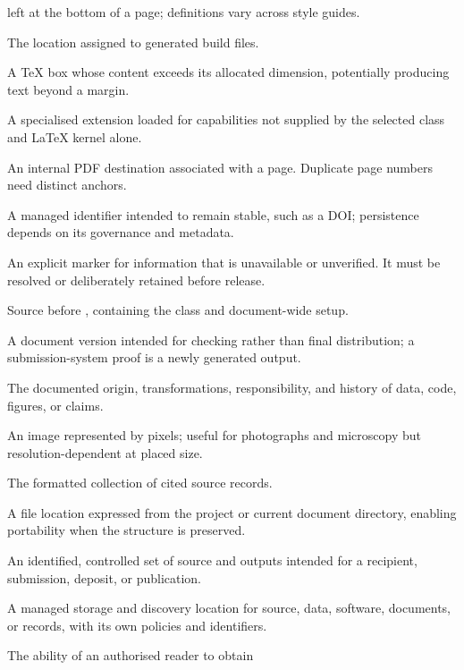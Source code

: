 \begin{description}[style=nextline,leftmargin=1.6em,itemsep=0.75em]
        left at the bottom of a page; definitions vary across style guides.
  \item[Output directory] The location assigned to generated build files.
  \item[Overfull box] A TeX box whose content exceeds its allocated dimension,
        potentially producing text beyond a margin.
  \item[Package] A specialised extension loaded for capabilities not supplied by
        the selected class and \LaTeX{} kernel alone.
  \item[Page anchor] An internal PDF destination associated with a page. Duplicate
        page numbers need distinct anchors.
  \item[Persistent identifier] A managed identifier intended to remain stable,
        such as a DOI; persistence depends on its governance and metadata.
  \item[Placeholder] An explicit marker for information that is unavailable or
        unverified. It must be resolved or deliberately retained before release.
  \item[Preamble] Source before , containing the
        class and document-wide setup.
  \item[Proof] A document version intended for checking rather than final
        distribution; a submission-system proof is a newly generated output.
  \item[Provenance] The documented origin, transformations, responsibility, and
        history of data, code, figures, or claims.
  \item[Raster image] An image represented by pixels; useful for photographs and
        microscopy but resolution-dependent at placed size.
  \item[Reference list] The formatted collection of cited source records.
  \item[Relative path] A file location expressed from the project or current
        document directory, enabling portability when the structure is preserved.
  \item[Release] An identified, controlled set of source and outputs intended for
        a recipient, submission, deposit, or publication.
  \item[Repository] A managed storage and discovery location for source, data,
        software, documents, or records, with its own policies and identifiers.
  \item[Reproducible compilation] The ability of an authorised reader to obtain

\end{description}
